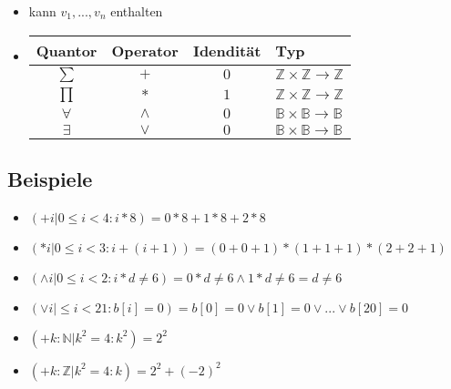 \documentclass[a4paper,10pt]{article}
\newcommand{\BN}{\mathbb{B}} %
\newcommand{\NN}{\mathbb{N}} %
\newcommand{\ZN}{\mathbb{Z}} %
\newcommand{\ra}{\rightarrow}
\begin{document}
\begin{description}
\begin{itemize}
		\item kann $v_1, ..., v_n$ enthalten
		\item \begin{tabular}{ c c c l }
				  Quantor & Operator & Idendit\"at & Typ \\
				  \hline 
				  $\sum$ & $+$ & $0$ & $\ZN \times \ZN \ra \ZN$  \\
				  $\prod$ & $*$ & $1$ & $\ZN \times \ZN \ra \ZN$  \\
				  $\forall$ & $\wedge$ & $0$ & $\BN \times \BN \ra \BN$  \\
				  $\exists$ & $\vee$ & $0$ & $\BN \times \BN \ra \BN$ \\
			\end{tabular}
	\end{itemize}
\end{description}

\subsection{Beispiele}
\begin{itemize} 
	\item $(+ i | 0 \leq i < 4:i*8) = 0*8 + 1*8 + 2 *8$
	\item $(* i | 0 \leq i < 3:i+(i+1)) =(0 + 0 + 1) * (1 + 1 + 1) * (2 + 2 + 1)$
	\item $(\wedge i | 0 \leq i < 2:i*d \neq 6) = 0*d \neq 6 \wedge 1*d \neq 6 = d \neq 6$  
	\item $(\vee i| \leq i < 21:b[i]=0) = b[0] = 0 \vee b[1] = 0 \vee ... \vee b[20] = 0$
	\item $(+k:\NN | k^2=4:k^2)=2^2$
	\item $(+k:\ZN | k^2=4:k)=2^2 + (-2)^2$
\end{itemize}
\end{document}
